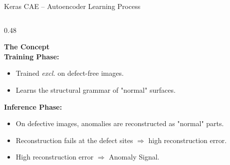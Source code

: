 \documentclass[aspectratio=169,10pt]{beamer}
\begin{document}
\begin{frame}{Keras CAE -- Autoencoder Learning Process}
\begin{columns}[T]
  \begin{column}{0.48\textwidth}
    {\small
    \textbf{\color{teal} The Concept}\\[8pt]
    
    \textbf{Training Phase:}
    \begin{itemize}
      \item Trained \emph{excl.} on defect-free images.
      \item Learns the structural grammar of "normal" surfaces.
    \end{itemize}
    
    \textbf{Inference Phase:}
    \begin{itemize}
      \item On defective images, anomalies are reconstructed as "normal" parts.
      \item Reconstruction fails at the defect sites $\Rightarrow$ high reconstruction error.
      \item High reconstruction error $\Rightarrow$ Anomaly Signal.
    \end{itemize}
    }
  \end{column}


\end{columns}
\end{frame}
\end{document}
